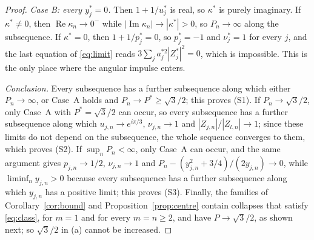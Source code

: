 \documentclass[11pt]{article}
\theoremstyle{definition}
\newcommand{\re}{\operatorname{Re}}
\newcommand{\im}{\operatorname{Im}}
\begin{document}
\begin{proof}
\emph{Case B: every $y_j^* = 0$.} Then $1 + 1/u_j^*$ is real, so $\kappa^*$ is purely imaginary. If $\kappa^* \ne 0$, then $\re\kappa_n \to 0^-$ while $|\im\kappa_n| \to |\kappa^*| > 0$, so $P_n \to \infty$ along the subsequence. If $\kappa^* = 0$, then $1 + 1/p_j^* = 0$, so $p_j^* = -1$ and $\nu_j^* = 1$ for every $j$, and the last equation of \eqref{eq:limit} reads $3\sum_j a_j^{*2}|Z_j^*|^2 = 0$, which is impossible. This is the only place where the angular impulse enters.

\emph{Conclusion.} Every subsequence has a further subsequence along which either $P_n \to \infty$, or Case~A holds and $P_n \to P^* \ge \sqrt{3}/2$; this proves (S1). If $P_n \to \sqrt{3}/2$, only Case~A with $P^* = \sqrt{3}/2$ can occur, so every subsequence has a further subsequence along which $u_{j,n} \to e^{i\pi/3}$, $\nu_{j,n} \to 1$ and $|Z_{j,n}|/|Z_{l,n}| \to 1$; since these limits do not depend on the subsequence, the whole sequence converges to them, which proves (S2). If $\sup_n P_n < \infty$, only Case~A can occur, and the same argument gives $p_{j,n} \to 1/2$, $\nu_{j,n} \to 1$ and $P_n - (y_{j,n}^2 + 3/4)/(2y_{j,n}) \to 0$, while $\liminf_n y_{j,n} > 0$ because every subsequence has a further subsequence along which $y_{j,n}$ has a positive limit; this proves (S3). Finally, the families of Corollary~\ref{cor:bound} and Proposition~\ref{prop:centre} contain collapses that satisfy \eqref{eq:class}, for $m = 1$ and for every $m = n \ge 2$, and have $P \to \sqrt{3}/2$, as shown next; so $\sqrt{3}/2$ in (a) cannot be increased.
\end{proof}
\end{document}
